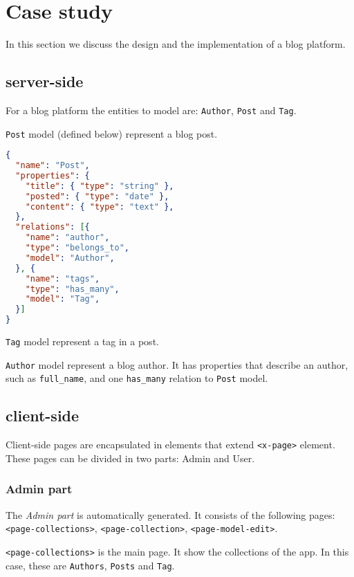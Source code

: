 \section{Case study}
In this section we discuss the design and the implementation of a blog platform. 

\subsection{server-side}
For a blog platform the entities to model are: \texttt{Author}, \texttt{Post} and \texttt{Tag}.

\texttt{Post} model (defined below) represent a blog post.

\begin{lstlisting}[language=json]
{
  "name": "Post",
  "properties": {
    "title": { "type": "string" },
    "posted": { "type": "date" },
    "content": { "type": "text" },
  }, 
  "relations": [{ 
    "name": "author", 
    "type": "belongs_to",
    "model": "Author",
  }, {
    "name": "tags", 
    "type": "has_many",
    "model": "Tag",
  }]
}
\end{lstlisting}

\texttt{Tag} model represent a tag in a post.

\texttt{Author} model represent a blog author. It has properties that describe an author, such as \texttt{full\_name}, and one \texttt{has\_many} relation to \texttt{Post} model.

  
\subsection{client-side}
Client-side pages are encapsulated in elements that extend \texttt{<x-page>} element. These pages can be divided in two parts: Admin and User.

\subsubsection{Admin part}
The \emph{Admin part} is automatically generated. 
It consists of the following pages: \texttt{<page-collections>}, \texttt{<page-collection>}, \texttt{<page-model-edit>}.

\vspace{0.2cm}

\texttt{<page-collections>} is the main page. It show the collections of the app. In this case, these are \texttt{Authors}, \texttt{Posts} and \texttt{Tag}.

\vspace{0.2cm}

